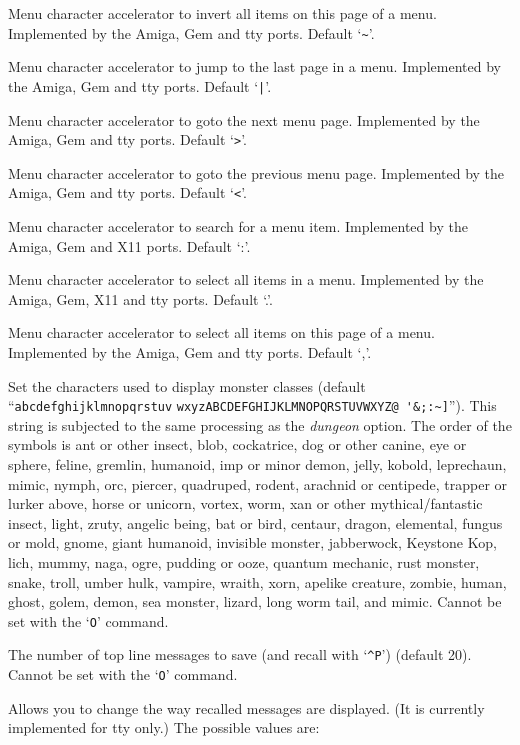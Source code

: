 Menu character accelerator to invert all items on this page of a menu.
Implemented by the Amiga, Gem and tty ports.
Default `\verb+~+'.
\item[\ib{menu\_last\_page}]
Menu character accelerator to jump to the last page in a menu.
Implemented by the Amiga, Gem and tty ports.
Default `\verb+|+'.
\item[\ib{menu\_next\_page}]
Menu character accelerator to goto the next menu page.
Implemented by the Amiga, Gem and tty ports.
Default `\verb+>+'.
\item[\ib{menu\_previous\_page}]
Menu character accelerator to goto the previous menu page.
Implemented by the Amiga, Gem and tty ports.
Default `\verb+<+'.
\item[\ib{menu\_search}]
Menu character accelerator to search for a menu item.
Implemented by the Amiga, Gem and X11 ports.
Default `:'.
\item[\ib{menu\_select\_all}]
Menu character accelerator to select all items in a menu.
Implemented by the Amiga, Gem, X11 and tty ports.
Default `.'.
\item[\ib{menu\_select\_page}]
Menu character accelerator to select all items on this page of a menu.
Implemented by the Amiga, Gem and tty ports.
Default `,'.
\item[\ib{monsters}]
Set the characters used to display monster classes (default
``\verb+abcdefghijklmnopqrstuv+
\verb+wxyzABCDEFGHIJKLMNOPQRSTUVWXYZ@ '&;:~]+'').
This string is subjected to the same processing as the {\it dungeon\/} option.
The order of the symbols is
ant or other insect, blob, cockatrice,
dog or other canine, eye or sphere, feline,
gremlin, humanoid, imp or minor demon,
jelly, kobold, leprechaun,
mimic, nymph, orc,
piercer, quadruped, rodent,
arachnid or centipede, trapper or lurker above, horse or unicorn,
vortex, worm, xan or other mythical/fantastic insect,
light, zruty,
angelic being, bat or bird, centaur,
dragon, elemental, fungus or mold,
gnome, giant humanoid, invisible monster,
jabberwock, Keystone Kop, lich,
mummy, naga, ogre,
pudding or ooze, quantum mechanic, rust monster,
snake, troll, umber hulk,
vampire, wraith, xorn,
apelike creature, zombie,
human, ghost, golem,
demon, sea monster, lizard,
long worm tail, and mimic.
Cannot be set with the `{\tt O}' command.
\item[\ib{msghistory}]
The number of top line messages to save (and recall with `{\tt \^{}P}')
(default 20). Cannot be set with the `{\tt O}' command.
\item[\ib{msg\_window}]
Allows you to change the way recalled messages are displayed.
(It is currently implemented for tty only.) The possible values are:

